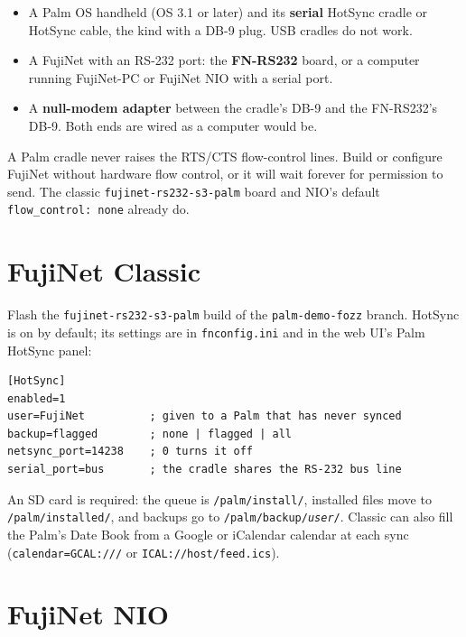 \documentclass[11pt,letterpaper,openany]{book}
\begin{document}
\begin{itemize}
  \item A Palm OS handheld (OS 3.1 or later) and its \textbf{serial} HotSync
    cradle or HotSync cable, the kind with a DB-9 plug. USB cradles do not
    work.
  \item A FujiNet with an RS-232 port: the \textbf{FN-RS232} board, or a
    computer running FujiNet-PC or FujiNet NIO with a serial port.
  \item A \textbf{null-modem adapter} between the cradle's DB-9 and the
    FN-RS232's DB-9. Both ends are wired as a computer would be.
\end{itemize}

\begin{warn}
A Palm cradle never raises the RTS/CTS flow-control lines. Build or configure
FujiNet without hardware flow control, or it will wait forever for permission
to send. The classic \texttt{fujinet-rs232-s3-palm} board and NIO's default
\texttt{flow\_control: none} already do.
\end{warn}

\section{FujiNet Classic}

Flash the \texttt{fujinet-rs232-s3-palm} build of the \texttt{palm-demo-fozz}
branch. HotSync is on by default; its settings are in \texttt{fnconfig.ini}
and in the web UI's \textsf{Palm HotSync} panel:

\begin{codebox}
\begin{verbatim}
[HotSync]
enabled=1
user=FujiNet          ; given to a Palm that has never synced
backup=flagged        ; none | flagged | all
netsync_port=14238    ; 0 turns it off
serial_port=bus       ; the cradle shares the RS-232 bus line
\end{verbatim}
\end{codebox}

An SD card is required: the queue is \texttt{/palm/install/}, installed files
move to \texttt{/palm/installed/}, and backups go to
\texttt{/palm/backup/\emph{user}/}. Classic can also fill the Palm's Date Book
from a Google or iCalendar calendar at each sync (\texttt{calendar=GCAL:///}
or \texttt{ICAL://host/feed.ics}).

\section{FujiNet NIO}
\end{document}
